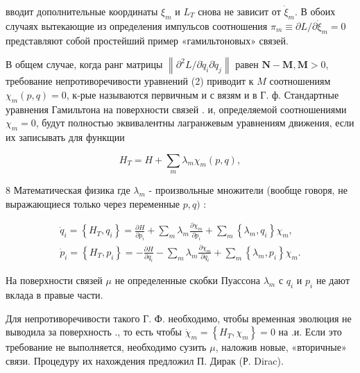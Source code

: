 \documentclass[10pt]{article}
\begin{document}
вводит дополнительные координаты $\xi_{m}$ и $L_{T}$ снова не зависит от $\dot{\xi}_{m}$. В обоих случаях вытекающие из определения импульсов соотношения $\pi_{m} \equiv \partial L / \partial \dot{\xi}_{m}=0$ представляют собой простейший пример «гамильтоновых» связей.



В общем случае, когда ранг матрицы $\left\|\partial^{2} L / \partial \dot{q}_{i} \partial \dot{q}_{j}\right\|$ равен $\boldsymbol{N}-\boldsymbol{M}, \boldsymbol{M}>0$, требование непротиворечивости уравнений (2) приводит к $M$ соотношениям $\chi_{m}(p, q)=0$, к-рые называются первичным и с вязям и в Г. ф. Стандартные уравнения Гамильтона на поверхности связей . $и$, определяемой соотношениями $\chi_{m}=0$, будут полностью эквивалентны лагранжевым уравнениям движения, если их записывать для функщии



\[

H_{T}=H+\sum_{m} \lambda_{m} \chi_{m}(p, q),

\]



8 Математическая физика где $\lambda_{m}$ - произвольные множители (вообще говоря, не выражающиеся только через переменные $p, q)$ :



\[

\begin{gathered}

\dot{q}_{i}=\left\{H_{T}, q_{i}\right\}=\frac{\partial H}{\partial p_{i}}+\sum_{m} \lambda_{m} \frac{\partial \chi_{m}}{\partial p_{i}}+\sum_{m}\left\{\lambda_{m}, q_{i}\right\} \chi_{m}, \\

\dot{p}_{i}=\left\{H_{T}, p_{i}\right\}=-\frac{\partial H}{\partial q_{i}}-\sum_{m} \lambda_{m} \frac{\partial \chi_{m}}{\partial q_{i}}+\sum_{m}\left\{\lambda_{m}, p_{i}\right\} \chi_{m} .

\end{gathered}

\]



На поверхности связей $\mu$ не определенные скобки Пуассона $\lambda_{m}$ с $q_{i}$ и $p_{i}$ не дают вклада в правые части.



Для непротиворечивости такого Г. Ф. необходимо, чтобы временная эволюция не выводила за поверхность ., то есть чтобы $\dot{\chi}_{m}=\left\{H_{T}, \chi_{m}\right\}=0$ на .и. Если это требование не выполняется, необходимо сузить $\mathscr{\mu}$, наложив новые, «вторичные» связи. Процедуру их нахождения предложил П. Дирак (Р. Dirac).
\end{document}
